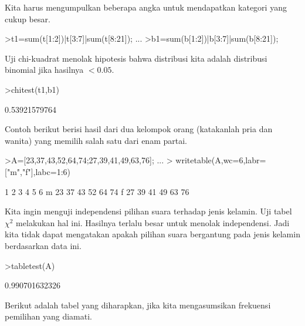 \documentclass[a4paper,11pt,oneside,enabledeprecatedfontcommands]{scrbook}
\newenvironment{eulernotebook}{}{}
\newenvironment{eulercomment}{\par\medskip\noindent}{\par\medskip}
\begin{document}
\begin{eulernotebook}
\begin{eulerprompt}
		\end{eulerprompt}
		\begin{eulercomment}
			Kita harus mengumpulkan beberapa angka untuk mendapatkan kategori yang cukup besar.
		\end{eulercomment}
		\begin{eulerprompt}
			>t1=sum(t[1:2])|t[3:7]|sum(t[8:21]); ...
			>b1=sum(b[1:2])|b[3:7]|sum(b[8:21]);
		\end{eulerprompt}
		\begin{eulercomment}
			Uji chi-kuadrat menolak hipotesis bahwa distribusi kita adalah distribusi binomial jika hasilnya
			$< 0.05$.
		\end{eulercomment}
		\begin{eulerprompt}
			>chitest(t1,b1)
		\end{eulerprompt}
		\begin{euleroutput}
			0.53921579764
		\end{euleroutput}
		\begin{eulercomment}
			Contoh berikut berisi hasil dari dua kelompok orang (katakanlah pria dan wanita) yang memilih salah
			satu dari enam partai.
		\end{eulercomment}
		\begin{eulerprompt}
			>A=[23,37,43,52,64,74;27,39,41,49,63,76];  ...
			>  writetable(A,wc=6,labr=["m","f"],labc=1:6)
		\end{eulerprompt}
		\begin{euleroutput}
			           1     2     3     4     5     6
			     m    23    37    43    52    64    74
			     f    27    39    41    49    63    76
		\end{euleroutput}
		\begin{eulercomment}
			Kita ingin menguji independensi pilihan suara terhadap jenis kelamin. Uji tabel $\chi^2$ melakukan hal
			ini. Hasilnya terlalu besar untuk menolak independensi. Jadi kita tidak dapat mengatakan apakah
			pilihan suara bergantung pada jenis kelamin berdasarkan data ini.
		\end{eulercomment}
		\begin{eulerprompt}
			>tabletest(A)
		\end{eulerprompt}
		\begin{euleroutput}
			0.990701632326
		\end{euleroutput}
		\begin{eulercomment}
			Berikut adalah tabel yang diharapkan, jika kita mengasumsikan frekuensi pemilihan yang diamati.
		\end{eulercomment}

\end{eulernotebook}
\end{document}
